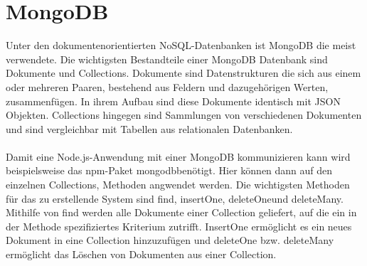\section{MongoDB}
Unter den dokumentenorientierten NoSQL-Datenbanken ist MongoDB die meist verwendete. Die wichtigsten Bestandteile einer MongoDB Datenbank sind Dokumente und Collections. Dokumente sind Datenstrukturen die sich aus einem oder mehreren Paaren, bestehend aus Feldern und dazugehörigen Werten, zusammenfügen. In ihrem Aufbau sind diese Dokumente identisch mit JSON Objekten. Collections hingegen sind Sammlungen von verschiedenen Dokumenten und sind vergleichbar mit Tabellen aus relationalen Datenbanken.
\\
\\
Damit eine Node.js-Anwendung mit einer MongoDB kommunizieren kann wird beispielsweise das \glqq npm\grqq-Paket \glqq mongodb\grqq benötigt. Hier können dann auf den einzelnen Collections, Methoden angwendet werden. Die wichtigsten Methoden für das zu erstellende System sind \glqq find\grqq , \glqq insertOne\grqq , \glqq deleteOne\grqq und \glqq deleteMany\grqq. Mithilfe von find werden alle Dokumente einer Collection geliefert, auf die ein in der Methode spezifiziertes Kriterium zutrifft. InsertOne ermöglicht es ein neues Dokument in eine Collection hinzuzufügen und deleteOne bzw. deleteMany ermöglicht das Löschen von Dokumenten aus einer Collection.

